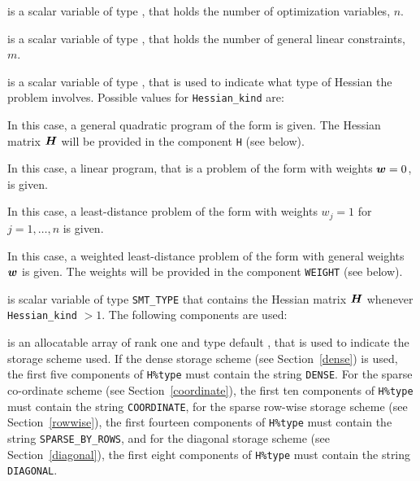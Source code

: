 \documentclass{galahad}
\begin{document}
\begin{description}

 is a scalar variable of type \integer, 
 that holds the number of optimization variables, $n$.  
              
 is a scalar variable of type \integer, 
 that holds the number of general linear constraints, $m$.
              
 is a scalar variable of type \integer, 
that is used to indicate what type of Hessian the problem involves.
Possible values for {\tt Hessian\_kind} are:

\begin{description}
  In this case, a general quadratic program of the form
 is given. The Hessian matrix ${\bm{H}}$ will be provided in the 
component {\tt H} (see below).

  In this case, a linear program, that is a problem of the form 
 with weights ${\bm{w}} = 0$, is given.

 In this case, a least-distance problem of the form 
with weights $w_{j} = 1$ for $j = 1, \ldots , n$ is given.

 In this case, a weighted least-distance problem of the form 
with general weights ${\bm{w}}$ is given. The weights will be
provided in the component {\tt WEIGHT} (see below).
\end{description}

 is scalar variable of type {\tt SMT\_TYPE} 
that contains the Hessian matrix ${\bm{H}}$ whenever {\tt Hessian\_kind} $>1$.
The following components are used:

\begin{description}

 is an allocatable array of rank one and type default \character, 
that is used to indicate the storage scheme used. If the dense storage scheme 
(see Section~\ref{dense}) is used, 
the first five components of {\tt H\%type} must contain the
string {\tt DENSE}.
For the sparse co-ordinate scheme (see Section~\ref{coordinate}), 
the first ten components of {\tt H\%type} must contain the
string {\tt COORDINATE},  
for the sparse row-wise storage scheme (see Section~\ref{rowwise}),
the first fourteen components of {\tt H\%type} must contain the
string {\tt SPARSE\_BY\_ROWS},
and for the diagonal storage scheme (see Section~\ref{diagonal}),
the first eight components of {\tt H\%type} must contain the
string {\tt DIAGONAL}.


\end{description}
\end{description}
\end{document}
